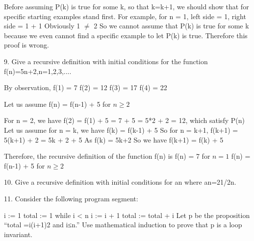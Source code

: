 \documentclass{article}
\begin{document}
\begin{large}
Before assuming P(k) is true for some k, so that k=k+1, we should show that for specific starting examples stand first.
For example, for n = 1, left side = 1, right side = 1 + 1
Obviously 1 $\neq$ 2
So we cannot assume that P(k) is true for some k because we even cannot find a specific example to let P(k) is true.
Therefore this proof is wrong.

9. Give a recursive definition with initial conditions for the function f(n)=5n+2,n=1,2,3,....

By observation, 
f(1) = 7
f(2) = 12
f(3) = 17
f(4) = 22

Let us assume f(n) = f(n-1) + 5 for $n \ge 2$

For n = 2, we have f(2) = f(1) + 5 = 7 + 5 = 5*2 + 2 = 12, which satisfy P(n)
Let us assume for n = k, we have f(k) = f(k-1) + 5
So for n = k+1, f(k+1) = 5(k+1) + 2 = 5k + 2 + 5
As f(k) = 5k+2
So we have f(k+1) = f(k) + 5

Therefore, the recursive definition of the function f(n) is
f(n) = 7 for $n = 1$
f(n) = f(n-1) + 5 for $n \ge 2$

10. Give a recursive definition with initial conditions for {an} where an=21/2n.

11. Consider the following program segment:

i := 1
total := 1 
while i < n
  i := i + 1
  total := total + i
Let p be the proposition “total =i(i+1)2 and i≤n.” Use mathematical induction to prove that p is a loop invariant.

\end{large}
\end{document}
